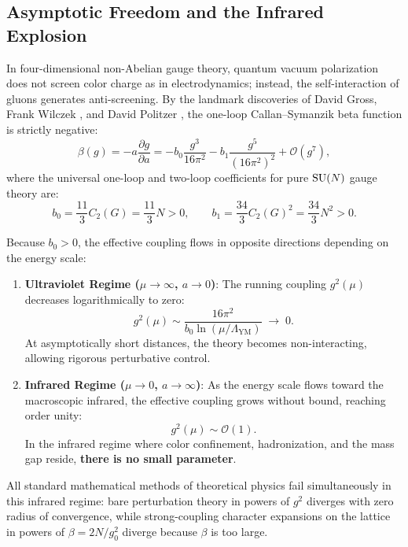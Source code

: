 \subsection{Asymptotic Freedom and the Infrared Explosion}
\label{subsec:asymptotic_freedom_intro}
In four-dimensional non-Abelian gauge theory, quantum vacuum polarization does not screen color charge as in electrodynamics; instead, the self-interaction of gluons generates anti-screening. By the landmark discoveries of David Gross, Frank Wilczek \cite{GrossWilczek1973}, and David Politzer \cite{Politzer1973}, the one-loop Callan--Symanzik beta function is strictly negative:
\begin{equation}
\label{eq:beta_function_intro}
\beta(g) = -a \frac{\partial g}{\partial a} = -b_0 \frac{g^3}{16\pi^2} - b_1 \frac{g^5}{(16\pi^2)^2} + \mathcal{O}(g^7),
\end{equation}
where the universal one-loop and two-loop coefficients for pure $\mathrm{SU}(N)$ gauge theory are:
\begin{equation}
b_0 = \frac{11}{3} C_2(G) = \frac{11}{3} N > 0, \qquad b_1 = \frac{34}{3} C_2(G)^2 = \frac{34}{3} N^2 > 0.
\end{equation}

Because $b_0 > 0$, the effective coupling flows in opposite directions depending on the energy scale:
\begin{enumerate}
    \item \textbf{Ultraviolet Regime ($\mu \to \infty$, $a \to 0$)}: The running coupling $g^2(\mu)$ decreases logarithmically to zero:
    \begin{equation}
    g^2(\mu) \sim \frac{16\pi^2}{b_0 \ln(\mu / \Lambda_{\mathrm{YM}})} \;\longrightarrow\; 0.
    \end{equation}
    At asymptotically short distances, the theory becomes non-interacting, allowing rigorous perturbative control.
    \item \textbf{Infrared Regime ($\mu \to 0$, $a \to \infty$)}: As the energy scale flows toward the macroscopic infrared, the effective coupling grows without bound, reaching order unity:
    \begin{equation}
    g^2(\mu) \sim \mathcal{O}(1).
    \end{equation}
    In the infrared regime where color confinement, hadronization, and the mass gap reside, \textbf{there is no small parameter}.
\end{enumerate}
All standard mathematical methods of theoretical physics fail simultaneously in this infrared regime: bare perturbation theory in powers of $g^2$ diverges with zero radius of convergence, while strong-coupling character expansions on the lattice in powers of $\beta = 2N/g_0^2$ diverge because $\beta$ is too large.

